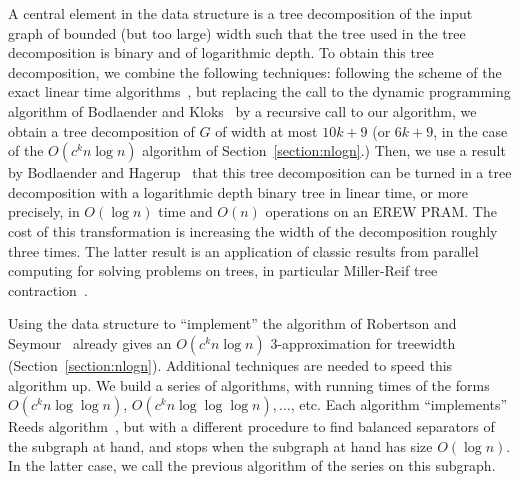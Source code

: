 \documentclass[a4paper,11pt]{article}
\theoremstyle{definition}
\theoremstyle{remark}
\begin{document}
A central element in the data structure is a tree decomposition of the
input graph of bounded (but too large) width such that the tree used
in the tree decomposition is binary and of logarithmic depth.  To
obtain this tree decomposition, we combine the following techniques:
following the scheme of the exact linear time
algorithms~\cite{Bodlaender96, PerkovicR00}, but replacing the call to
the dynamic programming algorithm of Bodlaender and
Kloks~\cite{BodlaenderK96} by a recursive call to our algorithm, we
obtain a tree decomposition of $G$ of width at most $10k+9$ (or
$6k+9$, in the case of the $O(c^k n \log n)$ algorithm of
Section~\ref{section:nlogn}.)  Then, we use a result by Bodlaender and
Hagerup~\cite{BodlaenderH98} that this tree decomposition can be
turned in a tree decomposition with a logarithmic depth binary tree in
linear time, or more precisely, in $O(\log n)$ time and $O(n)$ operations on an EREW PRAM.
The cost of this transformation is increasing the width of the decomposition roughly three times.
The latter result is an application of classic results from parallel computing for solving problems on trees,
in particular Miller-Reif tree contraction~\cite{MillerR89,MillerR91}.

Using the data structure to ``implement'' the algorithm of Robertson
and Seymour~\cite{RobertsonS13} already gives an $O(c^k n\log n)$
3-approximation for treewidth (Section~\ref{section:nlogn}).
Additional techniques are needed to speed this algorithm up.  We build
a series of algorithms, with running times of the forms $O(c^k n \log
\log n)$, $ O(c^k n \log \log \log n), \ldots$, etc.  Each algorithm
``implements'' Reeds algorithm~\cite{Reed92}, but with a different
procedure to find balanced separators of the subgraph at hand, and
stops when the subgraph at hand has size $O(\log n)$.  In the latter
case, we call the previous algorithm of the series on this subgraph.
\end{document}
